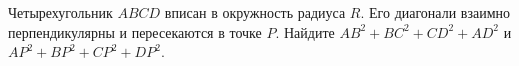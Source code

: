 \begin{ex}
	\begin{condition}
		Четырехугольник \( ABCD  \) вписан в окружность радиуса \( R \). Его диагонали взаимно перпендикулярны и пересекаются в точке \( P \). Найдите \( AB^2 + BC^2 + CD^2 + AD^2 \) и \( AP^2 + BP^2 + CP^2 + DP^2 \).
	\end{condition}
\end{ex}